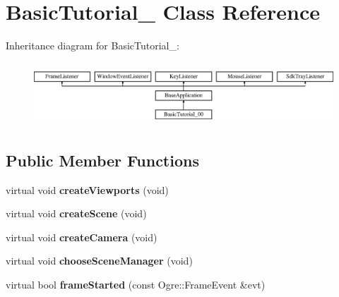 \hypertarget{class_basic_tutorial__00}{}\section{Basic\+Tutorial\+\_ Class Reference}
\label{class_basic_tutorial__00}
Inheritance diagram for Basic\+Tutorial\+\_\+:\begin{figure}[H]
\begin{center}
\leavevmode
\includegraphics[height=2.382979cm]{class_basic_tutorial__00}
\end{center}
\end{figure}
\subsection*{Public Member Functions}
\begin{DoxyCompactItemize}
\item 
\mbox{\label{class_basic_tutorial__00_adc2454d9f8226e0958ecf702f355846e}} 
virtual void {\bfseries create\+Viewports} (void)
\item 
\mbox{\label{class_basic_tutorial__00_a15a3d4673724ec99077ce992f996a550}} 
virtual void {\bfseries create\+Scene} (void)
\item 
\mbox{\label{class_basic_tutorial__00_a1bf709417d654dffc2ea10987412b912}} 
virtual void {\bfseries create\+Camera} (void)
\item 
\mbox{\label{class_basic_tutorial__00_aba97a29d983586d2dc8e108d3bccf721}} 
virtual void {\bfseries choose\+Scene\+Manager} (void)
\item 
\mbox{\label{class_basic_tutorial__00_a94e281a96584a25bf57b1c5e73737c81}} 
virtual bool {\bfseries frame\+Started} (const Ogre\+::\+Frame\+Event \&evt)
\end{DoxyCompactItemize}
